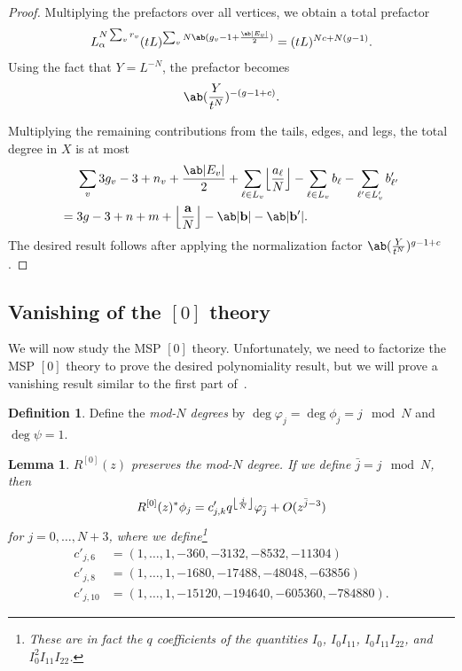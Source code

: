\documentclass[10pt]{amsart}
\DeclarePairedDelimiter{\floor}{\lfloor}{\rfloor}
\newtheorem{lem}[thm]{Lemma}
\theoremstyle{definition}
\newtheorem{defn}[thm]{Definition}
\theoremstyle{remark}
\theoremstyle{plain}
\theoremstyle{definition}
\theoremstyle{remark}
\newcommand{\ba}{\mathbf{a}}
\newcommand{\bb}{\mathbf{b}}
\newcommand{\1}{\mathbf{1}}
\newcommand{\2}{\mathbf{2}}
\newcommand{\3}{\mathbf{3}}
\numberwithin{equation}{section}
\begin{document}
\begin{proof}
    Multiplying the prefactors over all vertices, we obtain a total prefactor
    \[ L_{\alpha}^{N \sum_v r_v} (tL)^{\sum_v N \ab(g_v-1+\frac{\ab|E_v|}{2})} = (tL)^{Nc + N(g-1)}. \]
    Using the fact that $Y = L^{-N}$, the prefactor becomes
    \[ \ab(\frac{Y}{t^N})^{-(g-1+c)}. \]

    Multiplying the remaining contributions from the tails, edges, and legs, the total degree in $X$ is at most
    \begin{align*}
        & \sum_v 3g_v - 3 + n_v + \frac{\ab|E_v|}{2} + \sum_{\ell \in L_v} \floor*{\frac{a_{\ell}}{N}} - \sum_{\ell \in L_v} b_{\ell} - \sum_{\ell' \in L_v'} b'_{\ell'} \\
        ={}& 3g-3+n+m + \floor*{\frac{\ba}{N}} - \ab|\bb| - \ab|\bb'|.
    \end{align*}
    The desired result follows after applying the normalization factor $\ab(\frac{Y}{t^N})^{g-1+c}$.
\end{proof}

\subsection{Vanishing of the $[0]$ theory}%
\label{sub:Vanishing of the 0 theory}

We will now study the MSP $[0]$ theory. Unfortunately, we need to factorize the MSP $[0]$ theory to prove the desired polynomiality result, but we will prove a vanishing result similar to the first part of~.

\begin{defn}
    Define the \textit{mod-$N$ degrees} by $\deg \varphi_j = \deg \phi_j = j \mod{N}$ and $\deg \psi = 1$.
\end{defn}

\begin{lem}\label{lem:RpreservesmodNdegree}
    $R^{[0]}(z)$ preserves the mod-$N$ degree. If we define $\bar{j} = j\mod{N}$, then
    \[ R^{[0]}(z)^* \phi_j = c'_{j,k} q^{\floor*{\frac{j}{N}}} \varphi_{\bar{j}} + O(z^{\bar{j}-3}) \]
    for $j = 0,\ldots,N+3$, where we define\footnote{These are in fact the $q$ coefficients of the quantities $I_0$, $I_0 I_{11}$, $I_0 I_{11} I_{22}$, and $I_0^2 I_{11} I_{22}$.}
    \begin{align*}
        c'_{j,6} &= (1,\ldots,1,-360,-3132,-8532,-11304) \\
        c'_{j,8} &= (1,\ldots,1,-1680,-17488,-48048,-63856) \\
        c'_{j,10} &= (1,\ldots,1,-15120,-194640,-605360,-784880).
    \end{align*}
\end{lem}
\end{document}
